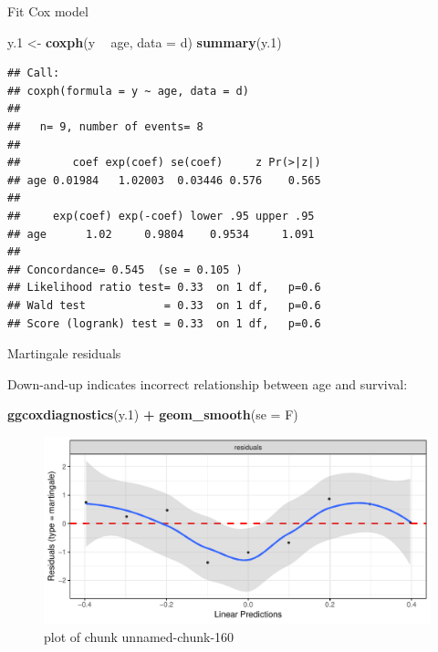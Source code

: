 \documentclass[ignorenonframetext,]{beamer}
\newenvironment{Shaded}{\begin{snugshade}}{\end{snugshade}}
\newcommand{\DataTypeTok}[1]{\textcolor[rgb]{0.13,0.29,0.53}{#1}}
\newcommand{\FloatTok}[1]{\textcolor[rgb]{0.00,0.00,0.81}{#1}}
\newcommand{\KeywordTok}[1]{\textcolor[rgb]{0.13,0.29,0.53}{\textbf{#1}}}
\newcommand{\NormalTok}[1]{#1}
\newcommand{\OperatorTok}[1]{\textcolor[rgb]{0.81,0.36,0.00}{\textbf{#1}}}
\newcommand{\StringTok}[1]{\textcolor[rgb]{0.31,0.60,0.02}{#1}}
\begin{document}
\begin{frame}[fragile]{Fit Cox model}
\protect\hypertarget{fit-cox-model}{}

\footnotesize

\begin{Shaded}
\begin{Highlighting}[]
\NormalTok{y}\FloatTok{.1}\NormalTok{ <-}\StringTok{ }\KeywordTok{coxph}\NormalTok{(y }\OperatorTok{~}\StringTok{ }\NormalTok{age, }\DataTypeTok{data =}\NormalTok{ d)}
\KeywordTok{summary}\NormalTok{(y}\FloatTok{.1}\NormalTok{)}
\end{Highlighting}
\end{Shaded}

\begin{verbatim}
## Call:
## coxph(formula = y ~ age, data = d)
## 
##   n= 9, number of events= 8 
## 
##        coef exp(coef) se(coef)     z Pr(>|z|)
## age 0.01984   1.02003  0.03446 0.576    0.565
## 
##     exp(coef) exp(-coef) lower .95 upper .95
## age      1.02     0.9804    0.9534     1.091
## 
## Concordance= 0.545  (se = 0.105 )
## Likelihood ratio test= 0.33  on 1 df,   p=0.6
## Wald test            = 0.33  on 1 df,   p=0.6
## Score (logrank) test = 0.33  on 1 df,   p=0.6
\end{verbatim}

\normalsize

\end{frame}

\begin{frame}[fragile]{Martingale residuals}
\protect\hypertarget{martingale-residuals}{}

Down-and-up indicates incorrect relationship between age and survival:

\begin{Shaded}
\begin{Highlighting}[]
\KeywordTok{ggcoxdiagnostics}\NormalTok{(y}\FloatTok{.1}\NormalTok{) }\OperatorTok{+}\StringTok{ }\KeywordTok{geom_smooth}\NormalTok{(}\DataTypeTok{se =}\NormalTok{ F)}
\end{Highlighting}
\end{Shaded}

\begin{figure}
\centering
\includegraphics{figure/unnamed-chunk-160-1.pdf}
\caption{plot of chunk unnamed-chunk-160}
\end{figure}

\end{frame}
\end{document}
